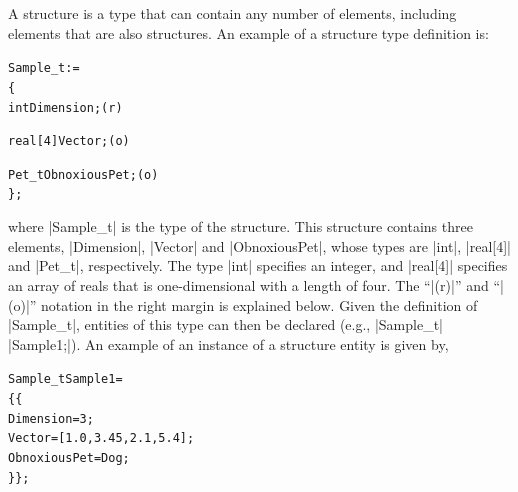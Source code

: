 A structure is a type that can contain any number of elements, including
elements that are also structures.
An example of a structure type definition is:
\begin{alltt}
  Sample\_t :=
    \{
    int Dimension ;                                                         (r)

    real[4] Vector ;                                                        (o)

    Pet\_t ObnoxiousPet ;                                                    (o)
    \} ;
\end{alltt}
where |Sample_t| is the type of the structure.
This structure contains three elements, |Dimension|, |Vector| and
|ObnoxiousPet|, whose types are |int|, |real[4]| and |Pet_t|, respectively.
The type |int| specifies an integer, and |real[4]| specifies an array of
reals that is one-dimensional with a length of four.
The ``|(r)|'' and ``|(o)|'' notation in the right margin is explained below.
Given the definition of |Sample_t|, entities of this type can then be
declared (e.g., |Sample_t| |Sample1;|).
An example of an instance of a structure entity is given by,
\begin{alltt}
  Sample\_t Sample1 = 
    \{\{
    Dimension = 3 ;
    Vector = [1.0, 3.45, 2.1, 5.4] ;
    ObnoxiousPet = Dog ;
    \}\} ;
\end{alltt}
